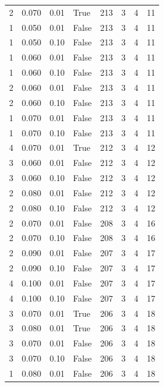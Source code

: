 \documentclass[a4paper,twoside,12pt]{book}
\begin{document}
\begin{table}
\begin{tabular}{rrrlrrrr}
				2 &  0.070 &     0.01 &     True &  213 &  3 &   4 &  11 \\
				1 &  0.050 &     0.01 &    False &  213 &  3 &   4 &  11 \\
				1 &  0.050 &     0.10 &    False &  213 &  3 &   4 &  11 \\
				1 &  0.060 &     0.01 &    False &  213 &  3 &   4 &  11 \\
				1 &  0.060 &     0.10 &    False &  213 &  3 &   4 &  11 \\
				2 &  0.060 &     0.01 &    False &  213 &  3 &   4 &  11 \\
				2 &  0.060 &     0.10 &    False &  213 &  3 &   4 &  11 \\
				1 &  0.070 &     0.01 &    False &  213 &  3 &   4 &  11 \\
				1 &  0.070 &     0.10 &    False &  213 &  3 &   4 &  11 \\
				4 &  0.070 &     0.01 &     True &  212 &  3 &   4 &  12 \\
				3 &  0.060 &     0.01 &    False &  212 &  3 &   4 &  12 \\
				3 &  0.060 &     0.10 &    False &  212 &  3 &   4 &  12 \\
				2 &  0.080 &     0.01 &    False &  212 &  3 &   4 &  12 \\
				2 &  0.080 &     0.10 &    False &  212 &  3 &   4 &  12 \\
				2 &  0.070 &     0.01 &    False &  208 &  3 &   4 &  16 \\
				2 &  0.070 &     0.10 &    False &  208 &  3 &   4 &  16 \\
				2 &  0.090 &     0.01 &    False &  207 &  3 &   4 &  17 \\
				2 &  0.090 &     0.10 &    False &  207 &  3 &   4 &  17 \\
				4 &  0.100 &     0.01 &    False &  207 &  3 &   4 &  17 \\
				4 &  0.100 &     0.10 &    False &  207 &  3 &   4 &  17 \\
				3 &  0.070 &     0.01 &     True &  206 &  3 &   4 &  18 \\
				3 &  0.080 &     0.01 &     True &  206 &  3 &   4 &  18 \\
				3 &  0.070 &     0.01 &    False &  206 &  3 &   4 &  18 \\
				3 &  0.070 &     0.10 &    False &  206 &  3 &   4 &  18 \\
				1 &  0.080 &     0.01 &    False &  206 &  3 &   4 &  18 \\

\end{tabular}
\end{table}
\end{document}
